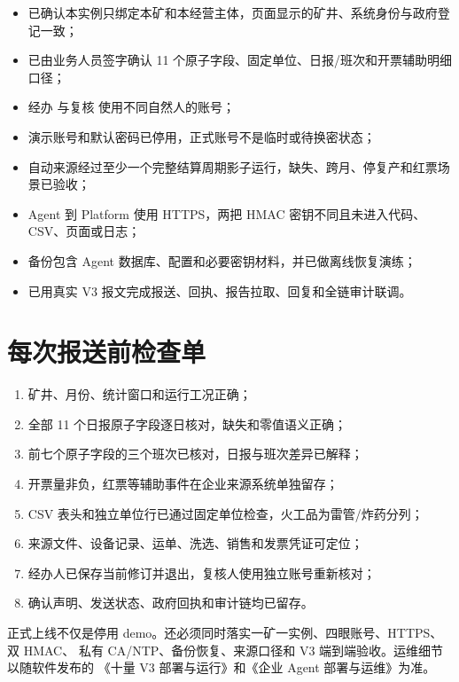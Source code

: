 \documentclass[UTF8,openany,zihao=-4,fontset=none]{ctexbook}
\begin{document}
\begin{itemize}
  \item 已确认本实例只绑定本矿和本经营主体，页面显示的矿井、系统身份与政府登记一致；
  \item 已由业务人员签字确认 11 个原子字段、固定单位、日报/班次和开票辅助明细口径；
  \item 经办  与复核  使用不同自然人的账号；
  \item 演示账号和默认密码已停用，正式账号不是临时或待换密状态；
  \item 自动来源经过至少一个完整结算周期影子运行，缺失、跨月、停复产和红票场景已验收；
  \item Agent 到 Platform 使用 HTTPS，两把 HMAC 密钥不同且未进入代码、CSV、页面或日志；
  \item 备份包含 Agent 数据库、配置和必要密钥材料，并已做离线恢复演练；
  \item 已用真实 V3 报文完成报送、回执、报告拉取、回复和全链审计联调。
\end{itemize}

\section{每次报送前检查单}

\begin{enumerate}
  \item 矿井、月份、统计窗口和运行工况正确；
  \item 全部 11 个日报原子字段逐日核对，缺失和零值语义正确；
  \item 前七个原子字段的三个班次已核对，日报与班次差异已解释；
  \item 开票量非负，红票等辅助事件在企业来源系统单独留存；
  \item CSV 表头和独立单位行已通过固定单位检查，火工品为雷管/炸药分列；
  \item 来源文件、设备记录、运单、洗选、销售和发票凭证可定位；
  \item 经办人已保存当前修订并退出，复核人使用独立账号重新核对；
  \item 确认声明、发送状态、政府回执和审计链均已留存。
\end{enumerate}

\begin{importantbox}
正式上线不仅是停用 demo。还必须同时落实一矿一实例、四眼账号、HTTPS、双 HMAC、
私有 CA/NTP、备份恢复、来源口径和 V3 端到端验收。运维细节以随软件发布的
《十量 V3 部署与运行》和《企业 Agent 部署与运维》为准。
\end{importantbox}
\end{document}
